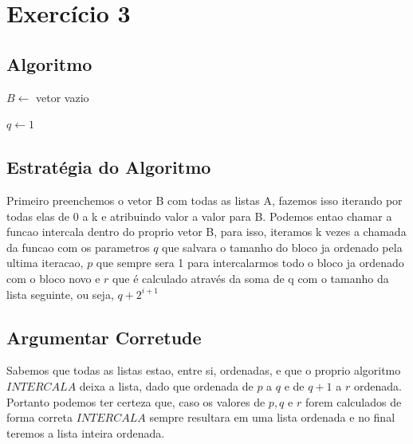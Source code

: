\documentclass[a4paper,12pt]{article}
\begin{document}
\section*{Exercício 3}
\subsection*{Algoritmo}
\begin{algorithm}[H]
\SetAlgoLined
\caption{INTER}


$B \leftarrow$ vetor vazio\;

$q \leftarrow 1$\;


\;
\end{algorithm}
\subsection*{Estratégia do Algoritmo}
Primeiro preenchemos o vetor B com todas as listas A, fazemos isso iterando por todas elas de 0 a k e atribuindo valor a valor para B. 
Podemos entao chamar a funcao intercala dentro do proprio vetor B, para isso, iteramos k vezes a chamada da funcao com os parametros $q$ que salvara o tamanho do bloco ja ordenado pela ultima iteracao, $p$ que sempre sera 1 para intercalarmos todo o bloco ja ordenado com o bloco novo e $r$ que é calculado através da soma de q com o tamanho da lista seguinte, ou seja, $q + 2^{i+1}$
\subsection*{Argumentar Corretude}
Sabemos que todas as listas estao, entre si, ordenadas, e que o proprio algoritmo $INTERCALA$ deixa a lista, dado que ordenada de $p$ a $q$ e de $q+1$ a $r$ ordenada. Portanto podemos ter certeza que, caso os valores de $p, q$ e $r$ forem calculados de forma correta $INTERCALA$ sempre resultara em uma lista ordenada e no final teremos a lista inteira ordenada.
\end{document}

